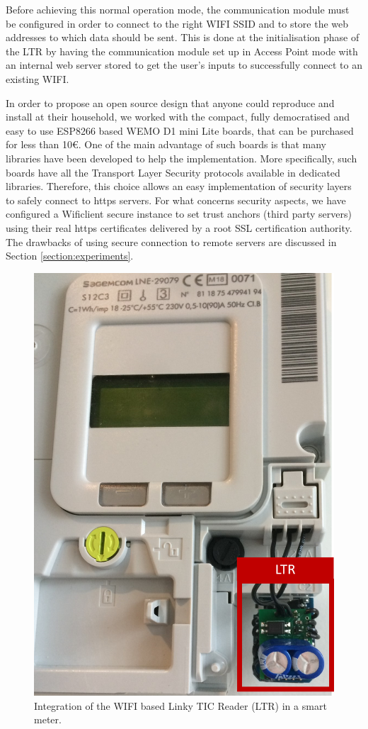 \documentclass[conference]{IEEEtran}
\begin{document}
Before achieving this normal operation mode, the communication module must be configured in order to connect to the right WIFI SSID and to store the web addresses to which data should be sent. This is done at the initialisation phase of the LTR by having the communication module set up in Access Point mode with an internal web server stored to get the user's inputs to  successfully connect to an existing WIFI. 

In order to propose an open source design that anyone could reproduce and install at their household, we worked with the compact, fully democratised and easy to use ESP8266 based WEMO D1 mini Lite boards, that can be purchased for less than 10€. One of the main advantage of such boards is that many libraries have been developed to help the implementation. More specifically, such boards have all the Transport Layer Security protocols available in dedicated libraries. Therefore, this choice  allows an easy implementation of security layers to safely connect to https servers. For what concerns security aspects, we have configured a Wificlient secure instance to set trust anchors (third party servers) using their real https  certificates delivered by a root SSL certification authority. The drawbacks of using secure connection to remote servers are discussed in Section \ref{section:experiments}.


\begin{figure}[h]
	\centering
	\includegraphics[width=0.5\columnwidth]{Images/dongle_Linky3}
	\caption{Integration of the WIFI based Linky TIC Reader (LTR) in a smart meter.}
	\label{Fig:dongle_Linky}
\end{figure}
\end{document}
